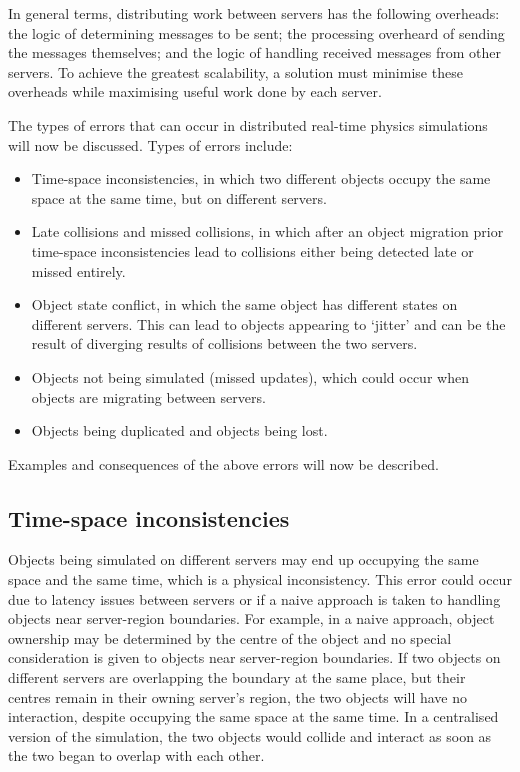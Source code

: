 In general terms, distributing work between servers has the following overheads: the logic of determining messages to be sent; the processing overheard of sending the messages themselves; and the logic of handling received messages from other servers.
To achieve the greatest scalability, a solution must minimise these overheads while maximising useful work done by each server.

The types of errors that can occur in distributed real-time physics simulations will now be discussed. 
Types of errors include:
\begin{itemize}
	\item Time-space inconsistencies, in which two different objects occupy the same space at the same time, but on different servers.
	\item Late collisions and missed collisions, in which after an object migration prior time-space inconsistencies lead to collisions either being detected late or missed entirely.
	\item Object state conflict, in which the same object has different states on different servers. This can lead to objects appearing to `jitter' and can be the result of diverging results of collisions between the two servers.	
	\item Objects not being simulated (missed updates), which could occur when objects are migrating between servers. 
	\item Objects being duplicated and objects being lost. 
\end{itemize}

Examples and consequences of the above errors will now be described.

\subsection{Time-space inconsistencies}
Objects being simulated on different servers may end up occupying the same space and the same time, which is a physical inconsistency. This error could occur due to latency issues between servers or if a naive approach is taken to handling objects near server-region boundaries. For example, in a naive approach, object ownership may be determined by the centre of the object and no special consideration is given to objects near server-region boundaries. If two objects on different servers are overlapping the boundary at the same place, but their centres remain in their owning server's region, the two objects will have no interaction, despite occupying the same space at the same time. In a centralised version of the simulation, the two objects would collide and interact as soon as the two began to overlap with each other.

